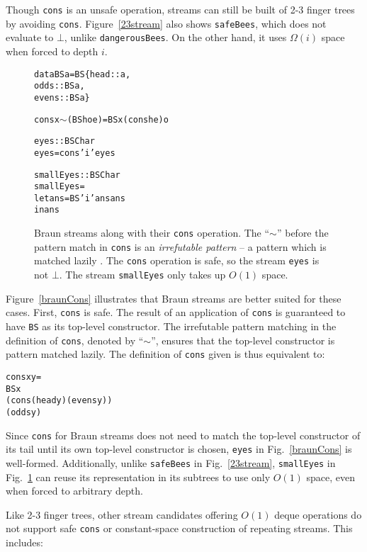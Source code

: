 \documentclass[envcountsect]{llncs}
\begin{document}
Though {\tt cons} is an unsafe operation, streams can still be built of 2-3 finger trees by avoiding {\tt cons}.
Figure~\ref{23stream} also shows {\tt safeBees}, which does not evaluate to $\bot$, unlike {\tt dangerousBees}.
On the other hand, it uses $\Omega(i)$ space when forced to depth $i$.

\begin{figure}
\begin{alltt}
data BS a = BS \{head::a, 
                odds::BS a, 
                evens::BS a\}

cons x \(\sim\)(BS h o e) = BS x (cons h e) o

eyes :: BS Char
eyes = cons 'i' eyes

smallEyes :: BS Char
smallEyes = 
  let ans = BS 'i' ans ans 
  in ans
\end{alltt}
\caption{
Braun streams along with their {\tt cons} operation.
The ``$\sim$'' before the pattern match in {\tt cons} is an {\em irrefutable pattern} -- a pattern which is matched lazily \cite{haskellReport}.
The {\tt cons} operation is safe, so the stream {\tt eyes} is not $\bot$.
The stream {\tt smallEyes} only takes up $O(1)$ space.
}
\label{braunDef}
\label{braunCons}
\label{braunShare}
\end{figure}

Figure~\ref{braunCons} illustrates that Braun streams are better suited for these cases.
First, {\tt cons} is safe.
The result of an application of {\tt cons} is guaranteed to have {\tt BS} as its top-level constructor.
The irrefutable pattern matching in the definition of {\tt cons}, denoted by ``$\sim$'', ensures that the top-level constructor is pattern matched lazily.
The definition of {\tt cons} given is thus equivalent to:

\begin{alltt}
cons x y =
  BS x
     (cons (head y) (evens y))
     (odds y)
\end{alltt}

Since {\tt cons} for Braun streams does not need to match the top-level constructor of its tail until its own top-level constructor is chosen, {\tt eyes} in Fig.~\ref{braunCons} is well-formed.
Additionally, unlike {\tt safeBees} in Fig.~\ref{23stream}, {\tt smallEyes} in Fig.~\ref{braunShare} can reuse its representation in its subtrees to use only $O(1)$ space, even when forced to arbitrary depth.

Like 2-3 finger trees, other stream candidates offering $O(1)$ deque operations do not support safe {\tt cons} or constant-space construction of repeating streams. This includes:
\end{document}
